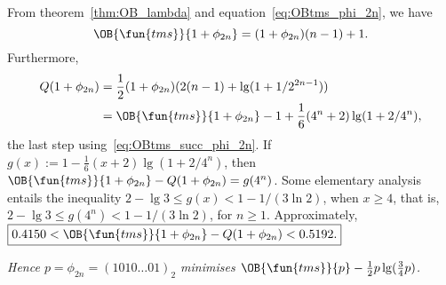 \begin{itemize}
    From theorem~\ref{thm:OB_lambda} and
    equation~\eqref{eq:OBtms_phi_2n}, we have
    \begin{equation}
      \OB{\fun{tms}}{1+\phi_{2n}} = (1+\phi_{2n})(n-1) + 1.
      \label{eq:OBtms_succ_phi_2n}
    \end{equation}
    Furthermore,
    \begin{align*}
      Q(1+\phi_{2n}) &= \frac{1}{2}(1+\phi_{2n}) (2(n-1) + \lg(1+1/2^{2n-1}))\\
                    &= \OB{\fun{tms}}{1+\phi_{2n}} - 1 +
      \frac{1}{6}(4^n + 2)\lg(1+2/4^n),
    \end{align*}
    the last step using~\eqref{eq:OBtms_succ_phi_2n}. If \(g(x) := 1 -
    \tfrac{1}{6}(x+2)\lg(1+2/4^n)\), then
    \(\OB{\fun{tms}}{1+\phi_{2n}} - Q(1+\phi_{2n}) = g(4^n)\). Some
    elementary analysis entails the inequality \(2 - \lg 3 \leqslant
    g(x) < 1 - 1/(3\ln 2)\), when \(x \geqslant 4\), that is, \(2 -
    \lg 3 \leqslant g(4^n) < 1 - 1/(3\ln 2)\), for \(n \geqslant
    1\). Approximately, \(\boxed{0.4150 <
      \smash{\OB{\fun{tms}}{1+\phi_{2n}}} - Q(1+\phi_{2n}) <
      0.5192.}\)

    \bigskip \textsl{Hence \(p=\phi_{2n} = (1010\dots01)_2\) minimises
      \(\OB{\fun{tms}}{p} - \tfrac{1}{2}p\lg(\tfrac{3}{4}p)\).}
    \bigskip


\end{itemize}
